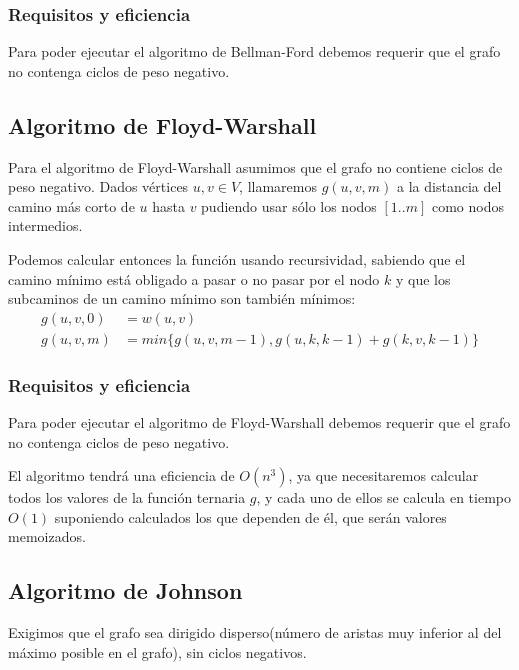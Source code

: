 \documentclass[a4paper, 11pt]{article} %
\begin{document}
    \subsubsection{Requisitos y eficiencia}
      Para poder ejecutar el algoritmo de Bellman-Ford debemos requerir que el grafo
      no contenga ciclos de peso negativo.
      
      
      
  \subsection{Algoritmo de Floyd-Warshall}
    Para el algoritmo de Floyd-Warshall asumimos que el grafo no contiene ciclos de peso negativo.
    Dados vértices $u,v \in V$, llamaremos $g(u,v,m)$ a la distancia del camino más corto de $u$
    hasta $v$ pudiendo usar sólo los nodos $[1..m]$ como nodos intermedios.
    
    Podemos calcular entonces la función usando recursividad, sabiendo que el
    camino mínimo está obligado a pasar o no pasar por el nodo $k$ y que los
    subcaminos de un camino mínimo son también mínimos:
    \begin{equation}
      \begin{split}
      g(u,v,0) &= w(u,v) \\
      g(u,v,m) &= min\{g(u,v,m-1), g(u,k,k-1)+g(k,v,k-1)\}
      \end{split}
    \end{equation}
    
    \subsubsection{Requisitos y eficiencia}
      Para poder ejecutar el algoritmo de Floyd-Warshall debemos requerir que el grafo
      no contenga ciclos de peso negativo.
      
      El algoritmo tendrá una eficiencia de $O(n^3)$, ya que necesitaremos calcular
      todos los valores de la función ternaria $g$, y cada uno de ellos se calcula
      en tiempo $O(1)$ suponiendo calculados los que dependen de él, que serán valores
      memoizados.
  
  \subsection{Algoritmo de Johnson}
      Exigimos que el grafo sea dirigido disperso(número de aristas muy inferior al del
      máximo posible en el grafo), sin ciclos negativos.
      
\end{document}
